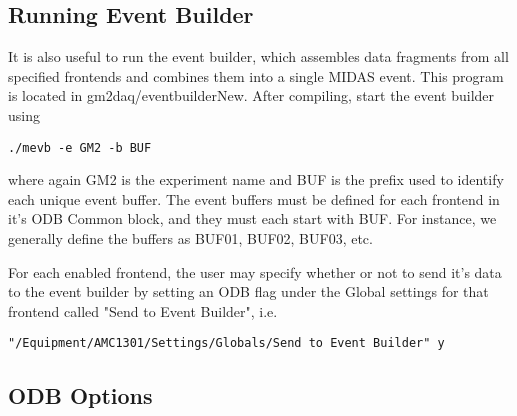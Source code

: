 \subsection{Running Event Builder}

It is also useful to run the event builder, which assembles data fragments from all specified frontends and combines them into a single MIDAS event. This program is located in gm2daq/eventbuilderNew. After compiling, start the event builder using

\begin{verbatim}
./mevb -e GM2 -b BUF
\end{verbatim}

where again GM2 is the experiment name and BUF is the prefix used to identify each unique event buffer. The event buffers must be defined for each frontend in it's ODB Common block, and they must each start with BUF. For instance, we generally define the buffers as BUF01, BUF02, BUF03, etc. 

For each enabled frontend, the user may specify whether or not to send it's data to the event builder by setting an ODB flag under the Global settings for that frontend called "Send to Event Builder", i.e.

\begin{verbatim}
"/Equipment/AMC1301/Settings/Globals/Send to Event Builder" y
\end{verbatim}

\subsection{ODB Options}